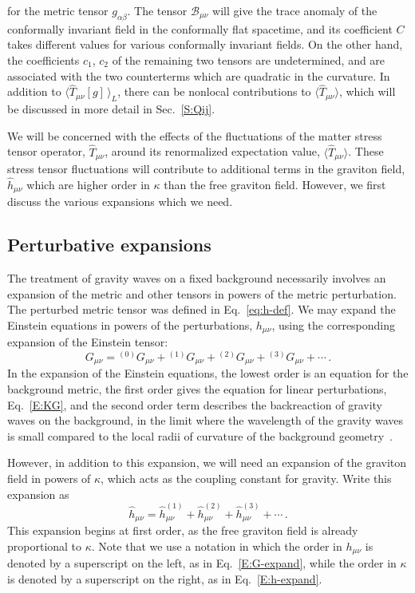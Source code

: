 \documentclass[preprint,prd,showpacs,superscriptaddress]{revtex4}
\begin{document}
for the metric tensor $g_{\alpha\beta}$. The tensor $\mathcal{B}_{\mu\nu}$ will give the trace anomaly of the conformally invariant 
field in the conformally flat spacetime, and its coefficient $C$ takes different values for various conformally invariant fields. 
On the other hand, the coefficients $c_{1}$, $c_{2}$ of the remaining two tensors are undetermined, and are associated with the
two counterterms which are quadratic in the curvature. In addition to
$\langle\hat{T}_{\mu\nu}[g]\,\rangle_{L}$, there can be nonlocal contributions to $\langle\hat{T}_{\mu\nu}\rangle$, which will
be discussed in more detail in Sec.~\ref{S:Qij}.

We will be concerned with the effects of the fluctuations of the matter stress tensor operator, $\hat{T}_{\mu\nu}$, around
its renormalized expectation value, $\langle\hat{T}_{\mu\nu}\rangle$. These stress tensor fluctuations will contribute 
to additional terms in the graviton field, $\hat{h}_{\mu\nu}$ which are higher order  in $\kappa$ than the free graviton field.
However, we first discuss the various expansions which we need.

\subsection{Perturbative expansions}
\label{S:pert}

The treatment of gravity waves on a fixed background necessarily involves an expansion of the metric and other tensors
in powers of the metric perturbation. The perturbed metric tensor was defined in Eq.~\eqref{eq:h-def}.
 We may expand the
Einstein equations in powers of the perturbations, $h_{\mu\nu}$, using the corresponding expansion of the Einstein tensor:
\begin{equation}
G_{\mu\nu} = {}^{(0)}G_{\mu\nu} + {}^{(1)}G_{\mu\nu} +{}^{(2)}G_{\mu\nu} + {}^{(3)}G_{\mu\nu} +\cdots \,. 
\label{E:G-expand}
\end{equation}
In the expansion of the Einstein equations, the lowest order is an equation for the background metric, the first
order gives the equation for linear perturbations, Eq.~\eqref{E:KG}, and the second order term describes the backreaction 
of gravity waves on the background, in the limit where the wavelength of the gravity waves is small
compared to the local radii of curvature of the background geometry~\cite{MTW}.

However, in addition to this expansion, we will need an expansion of the graviton field in powers of $\kappa$,
which acts as the coupling constant for gravity. Write this expansion as
\begin{equation}
\hat{h}_{\mu\nu}=\hat{h}^{(1)}_{\mu\nu}+\hat{h}^{(2)}_{\mu\nu}+\hat{h}^{(3)}_{\mu\nu}+\cdots \,.
\label{E:h-expand}
\end{equation}
This expansion begins at first order, as the free graviton field is already proportional to $\kappa$.
Note that we use a notation in which the order in $h_{\mu\nu}$ is denoted by a superscript on the left,
as in Eq.~\eqref{E:G-expand}, while the order in $\kappa$ is denoted by a superscript on the right,
as in Eq.~\eqref{E:h-expand}.
\end{document}
